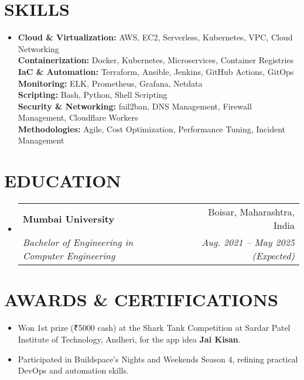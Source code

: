 \documentclass[letterpaper,11pt]{article}
\makeatletter
\newcommand{\resumeItem}[1]{%
  \item\small{#1\vspace{-2pt}}%
}
\newcommand{\resumeSubheading}[4]{%
  \vspace{-2pt}\item%
  \begin{tabular*}{0.97\textwidth}[t]{l@{\extracolsep{\fill}}r}%
    \textbf{#1} & #2 \\%
    \textit{\small #3} & \textit{\small #4} \\%
  \end{tabular*}\vspace{-7pt}%
}
\newcommand{\resumeSubHeadingListStart}{\begin{itemize}[leftmargin=0.15in, label={}]}
\newcommand{\resumeSubHeadingListEnd}{\end{itemize}}
\makeatother
\begin{document}
\section{SKILLS}
  \resumeSubHeadingListStart
    \item{
      \textbf{Cloud \& Virtualization:} AWS, EC2, Serverless, Kubernetes, VPC, Cloud Networking \\
      \textbf{Containerization:} Docker, Kubernetes, Microservices, Container Registries \\
      \textbf{IaC \& Automation:} Terraform, Ansible, Jenkins, GitHub Actions, GitOps \\
      \textbf{Monitoring:} ELK, Prometheus, Grafana, Netdata \\
      \textbf{Scripting:} Bash, Python, Shell Scripting \\
      \textbf{Security \& Networking:} fail2ban, DNS Management, Firewall Management, Cloudflare Workers \\
      \textbf{Methodologies:} Agile, Cost Optimization, Performance Tuning, Incident Management
    }
  \resumeSubHeadingListEnd

\section{EDUCATION}
  \resumeSubHeadingListStart
    \resumeSubheading
      {Mumbai University}{Boisar, Maharashtra, India}
      {Bachelor of Engineering in Computer Engineering}{Aug. 2021 -- May 2025 (Expected)}
  \resumeSubHeadingListEnd

\section{AWARDS \& CERTIFICATIONS}
  \resumeSubHeadingListStart
    \resumeItem{Won 1st prize (₹5000 cash) at the Shark Tank Competition at Sardar Patel Institute of Technology, Andheri, for the app idea \textbf{Jai Kisan}.}
    \resumeItem{Participated in Buildspace's Nights and Weekends Season 4, refining practical DevOps and automation skills.}
  \resumeSubHeadingListEnd
\end{document}
